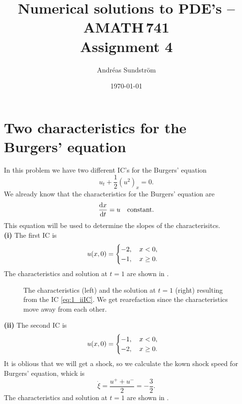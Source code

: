 \documentclass[11pt,letter, swedish, english
]{article}
\renewcommand{\thesubsection}{\arabic{section} (\alph{subsection})}
\begin{document}

\title{Numerical solutions to PDE's -- AMATH\,741 \\
Assignment 4}
\author{Andréas Sundström}
\date{\today}

\maketitle


\section{Two characteristics for the Burgers' equation}
In this problem we have two different IC's for the Burgers' equation
\begin{equation}
u_t + \frac{1}{2} (u^2)_x = 0.
\end{equation}
We already know that the characteristics for the Burgers' equation are
\begin{equation}
\dv{x}{t} = u \quad\text{constant.}
\end{equation}
This equation will be used to determine the slopes of the
characterisitcs. 
\\[11pt]
\noindent
\textbf{(i) }
The first IC is
\begin{equation}\label{eq:1_iIC}
u(x, 0) = 
\begin{cases}
-2\qcomma x<0,\\
-1\qcomma x\ge0.
\end{cases}
\end{equation}
The characteristics and solution at $t=1$ are shown in .

\begin{figure}
\centering
\resizebox{!}{3.6cm}{}
\caption{The characteristics (left) and the solution at $t=1$ (right) 
  resulting from the IC \eqref{eq:1_iiIC}. We get rearefaction since
  the characteristics move away from each other.} 
\label{fig:1i}
\end{figure}

\noindent
\textbf{(ii) }
The second IC is
\begin{equation}\label{eq:1_iiIC}
u(x, 0) = 
\begin{cases}
-1\qcomma x<0,\\
-2\qcomma x\ge0.
\end{cases}
\end{equation}
It is oblious that we will get a shock, so we calculate the kown shock
speed for Burgers' equation, whick is
\begin{equation}
\dot\xi = \frac{u^++u^-}{2} = -\frac{3}{2}.
\end{equation}
The characteristics and solution at $t=1$ are shown in .
\end{document}
